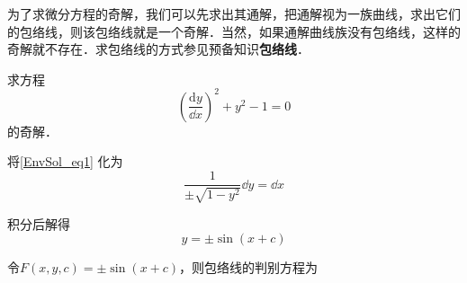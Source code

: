 为了求微分方程的奇解，我们可以先求出其通解，把通解视为一族曲线，求出它们的包络线，则该包络线就是一个奇解．当然，如果通解曲线族没有包络线，这样的奇解就不存在．求包络线的方式参见预备知识\textbf{包络线}．

\begin{example}{}
求方程
\begin{equation}\label{EnvSol_eq1}
(\frac{\mathrm{d} y}{\dd x})^2+y^2-1=0
\end{equation}
的奇解．

将\autoref{EnvSol_eq1} 化为
\begin{equation}
\frac{1}{\pm\sqrt{1-y^2}}\dd y=\dd x
\end{equation}

积分后解得
\begin{equation}
y=\pm\sin(x+c)
\end{equation}

令$F(x, y, c)=\pm\sin(x+c)$，则包络线的判别方程为



\end{example}
























